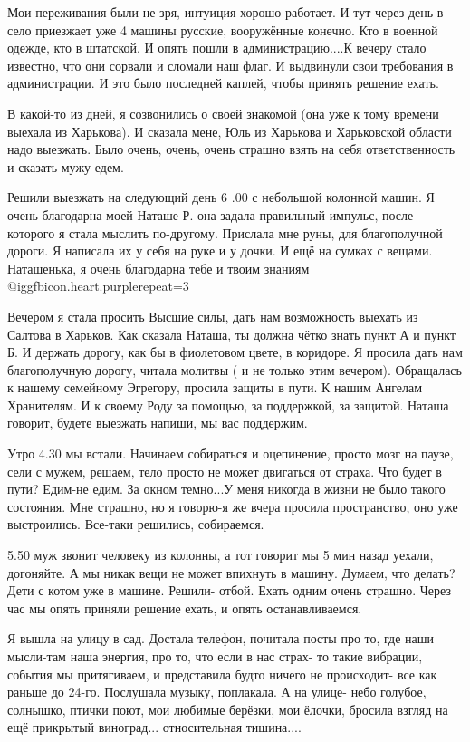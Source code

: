 Мои переживания были не зря, интуиция хорошо работает. И тут через день в село
приезжает уже 4 машины русские, вооружённые конечно. Кто в военной одежде, кто
в штатской. И опять пошли в администрацию....К вечеру стало известно, что они
сорвали и сломали наш флаг. И выдвинули свои требования в администрации. И это
было последней каплей, чтобы  принять решение ехать.

В какой-то из дней, я созвонились о своей знакомой (она уже к тому времени
выехала из Харькова). И сказала мене, Юль из Харькова и Харьковской области
надо выезжать. Было очень, очень, очень страшно взять на себя ответственность и
сказать мужу едем. 

Решили выезжать на следующий день 6 .00 с небольшой колонной машин. Я очень
благодарна моей Наташе Р. она задала правильный импульс, после которого я стала
мыслить по-другому.  Прислала мне руны, для благополучной дороги. Я написала их
у себя на руке и у дочки. И ещё на сумках с вещами. Наташенька, я очень
благодарна тебе и твоим знаниям @igg{fbicon.heart.purple}{repeat=3} 

Вечером я стала просить Высшие силы,  дать нам возможность выехать из Салтова в
Харьков. Как сказала Наташа, ты должна чётко знать пункт А и пункт Б. И держать
дорогу, как бы в фиолетовом цвете, в коридоре. Я просила дать нам благополучную
дорогу, читала молитвы ( и не только этим вечером). Обращалась к нашему
семейному Эгрегору, просила защиты в пути. К нашим Ангелам Хранителям. И к
своему Роду за помощью, за поддержкой, за защитой. Наташа говорит, будете
выезжать напиши, мы вас поддержим.

Утро 4.30 мы встали. Начинаем собираться и оцепинение, просто мозг на паузе,
сели с мужем, решаем, тело просто не может двигаться от страха. Что будет в
пути?  Едим-не едим. За окном темно...У меня никогда в жизни не было такого
состояния. Мне страшно, но я говорю-я же вчера просила пространство, оно уже
выстроились. Все-таки решились, собираемся.

5.50 муж звонит человеку из колонны, а тот говорит мы 5 мин назад уехали,
догоняйте. А мы никак вещи не может впихнуть в машину. Думаем, что делать? Дети
с котом уже  в машине. Решили- отбой. Ехать одним очень страшно. Через час мы
опять приняли решение ехать, и опять останавливаемся.

Я вышла на улицу в сад. Достала телефон, почитала посты про то, где наши
мысли-там наша энергия, про то, что если в нас страх- то такие вибрации,
события мы притягиваем, и представила будто ничего не происходит- все как
раньше до 24-го. Послушала музыку, поплакала. А  на улице- небо голубое,
солнышко, птички поют, мои любимые берёзки, мои ёлочки, бросила взгляд на ещё
прикрытый виноград... относительная тишина....


